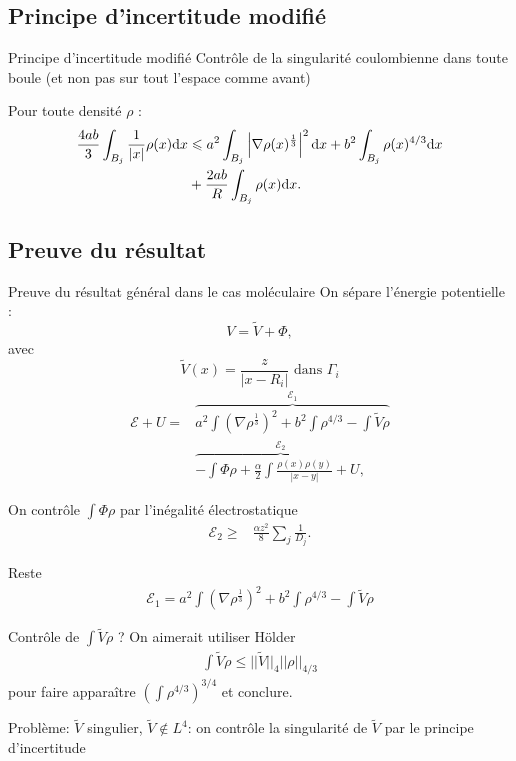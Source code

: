 \documentclass{beamer}
\newcommand{\dd}{\mathrm d}
\renewcommand{\leq}{\leqslant}
\renewcommand{\ge}{\geqslant}
\begin{document}
\subsection{Principe d'incertitude modifié}
\begin{frame}{Principe d'incertitude modifié}
  Contrôle de la singularité coulombienne dans toute boule (et non pas
  sur tout l'espace comme avant)

    \vspace{1cm}

    Pour toute densité $\rho$ :
    \begin{align*}
      \frac {4ab}{3} \int_{B_j}
       \frac 1 {|x|}\rho(x)\dd x &\leq
      a^2\int_{B_j}\left|\nabla \rho(x)^{\tiny{\frac{1}{3}}}\right|^2 \dd x + b^2 \int_{B_j} \rho(x)^{4/3}\dd x \\&+ \frac{2ab}{R} \int_{B_j}
    \rho(x)\dd x.
    \end{align*}

\end{frame}
\subsection{Preuve du résultat}
\newcommand{\vv}{\widetilde{V}}
\newcommand{\vvv}{\widehat{V}}
\begin{frame}{Preuve du résultat général dans le cas moléculaire}
    On sépare l'énergie potentielle :
    \[V = \vv + \Phi,\]
    avec
    \[\vv(x) = \frac z {|x - R_i|} \text{ dans $\Gamma_i$}\]
    \begin{align*}
    \mathcal{E} + U =&
    \overbrace{a^2\int (\nabla \rho^\frac{1}{3})^2 + b^2 \int \rho^{4/3}
    - \int \vv \rho}^{\mathcal{E}_1}\\
    &\overbrace{-\int \Phi \rho +  \frac{\alpha}{2}\int\frac{\rho(x) \rho(y)}{|x-y|}+U,}^{\mathcal{E}_2}
    \end{align*}
\end{frame}

\begin{frame}{}
  On contrôle $\int \Phi \rho$ par l'inégalité électrostatique
  \begin{align*}
        \mathcal{E}_2 \ge& \frac{\alpha z^2}{8}\sum_j \frac{1}{D_j}.
  \end{align*}

  Reste
  \begin{align*}
    \mathcal E_1 = {a^2\int (\nabla \rho^\frac{1}{3})^2 + b^2 \int \rho^{4/3}
    - \int \vv \rho}
\end{align*}

  Contrôle de $\int \vv \rho$ ? On aimerait utiliser H\"older
  \begin{align*}
    \int \vv \rho \leq ||\vv||_{4} ||\rho||_{4/3}
  \end{align*}
  pour faire apparaître $(\int \rho^{4/3})^{3/4}$ et conclure.

  Problème: $\vv$ singulier, $\vv \not \in L^{4}$: on contrôle la
  singularité de $\vv$ par le principe d'incertitude

\end{frame}
\end{document}
